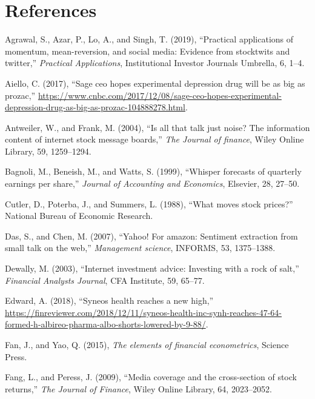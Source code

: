 \documentclass[11,]{article}
\begin{document}
\hypertarget{references}{%
\section*{References}\label{references}}

\hypertarget{refs}{}
\leavevmode\hypertarget{ref-agrawal2019}{}%
Agrawal, S., Azar, P., Lo, A., and Singh, T. (2019), ``Practical
applications of momentum, mean-reversion, and social media: Evidence
from stocktwits and twitter,'' \emph{Practical Applications},
Institutional Investor Journals Umbrella, 6, 1--4.

\leavevmode\hypertarget{ref-sage1}{}%
Aiello, C. (2017), ``Sage ceo hopes experimental depression drug will be
as big as prozac,''
\url{https://www.cnbc.com/2017/12/08/sage-ceo-hopes-experimental-depression-drug-as-big-as-prozac-104888278.html}.

\leavevmode\hypertarget{ref-antweiler2004}{}%
Antweiler, W., and Frank, M. (2004), ``Is all that talk just noise? The
information content of internet stock message boards,'' \emph{The
Journal of finance}, Wiley Online Library, 59, 1259--1294.

\leavevmode\hypertarget{ref-bagnoli1999}{}%
Bagnoli, M., Beneish, M., and Watts, S. (1999), ``Whisper forecasts of
quarterly earnings per share,'' \emph{Journal of Accounting and
Economics}, Elsevier, 28, 27--50.

\leavevmode\hypertarget{ref-cutler1988}{}%
Cutler, D., Poterba, J., and Summers, L. (1988), ``What moves stock
prices?'' National Bureau of Economic Research.

\leavevmode\hypertarget{ref-das2007}{}%
Das, S., and Chen, M. (2007), ``Yahoo! For amazon: Sentiment extraction
from small talk on the web,'' \emph{Management science}, INFORMS, 53,
1375--1388.

\leavevmode\hypertarget{ref-dewally2003}{}%
Dewally, M. (2003), ``Internet investment advice: Investing with a rock
of salt,'' \emph{Financial Analysts Journal}, CFA Institute, 59, 65--77.

\leavevmode\hypertarget{ref-synh}{}%
Edward, A. (2018), ``Syneos health reaches a new high,''
\url{https://finreviewer.com/2018/12/11/syneos-health-inc-synh-reaches-47-64-formed-h-albireo-pharma-albo-shorts-lowered-by-9-88/}.

\leavevmode\hypertarget{ref-Fan2015}{}%
Fan, J., and Yao, Q. (2015), \emph{The elements of financial
econometrics}, Science Press.

\leavevmode\hypertarget{ref-fang2009}{}%
Fang, L., and Peress, J. (2009), ``Media coverage and the cross-section
of stock returns,'' \emph{The Journal of Finance}, Wiley Online Library,
64, 2023--2052.
\end{document}
